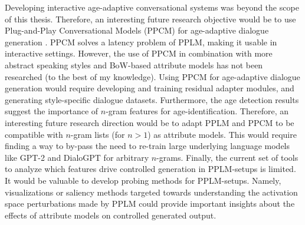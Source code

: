 Developing interactive age-adaptive conversational systems was beyond the scope of this thesis. Therefore, an interesting future research objective would be to use Plug-and-Play Conversational Models (PPCM) for age-adaptive dialogue generation \citep{madotto-etal-2020-plug}. PPCM solves a latency problem of PPLM, making it usable in interactive settings. However, the use of PPCM in combination with more abstract speaking styles and BoW-based attribute models has not been researched (to the best of my knowledge). Using PPCM for age-adaptive dialogue generation would require developing and training residual adapter modules, and generating style-specific dialogue datasets. Furthermore, the age detection results suggest the importance of $n$-gram features for age-identification. Therefore, an interesting future research direction would be to adapt PPLM and PPCM to be compatible with $n$-gram lists (for $n>1$) as attribute models. This would require finding a way to by-pass the need to re-train large underlying language models like GPT-2 and DialoGPT for arbitrary $n$-grams. Finally, the current set of tools to analyze which features drive controlled generation in PPLM-setups is limited. It would be valuable to develop probing methods for PPLM-setups. Namely, visualizations or saliency methods targeted towards understanding the activation space perturbations made by PPLM could provide important insights about the effects of attribute models on controlled generated output.

